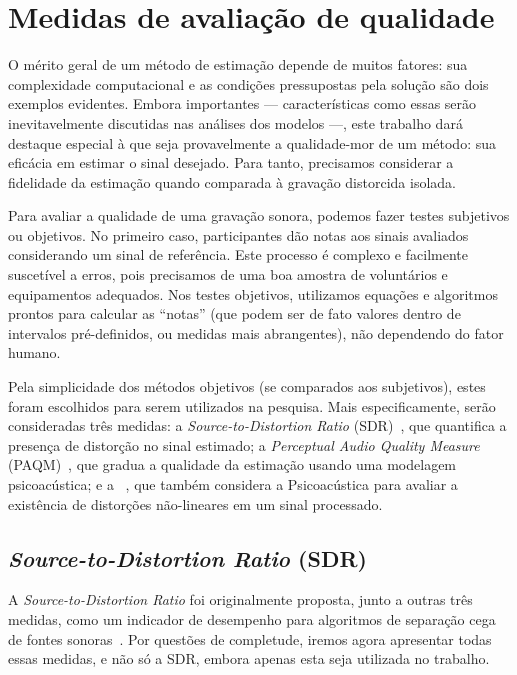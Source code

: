\chapter{Medidas de avaliação de qualidade}
\label{chapter:metrics}

O mérito geral de um método de estimação depende de muitos fatores: sua complexidade computacional e as condições pressupostas pela solução são dois exemplos evidentes. Embora importantes --- características como essas serão inevitavelmente discutidas nas análises dos modelos ---, este trabalho dará destaque especial à que seja provavelmente a qualidade-mor de um método: sua eficácia em estimar o sinal desejado. Para tanto, precisamos considerar a fidelidade da estimação quando comparada à gravação distorcida isolada.

Para avaliar a qualidade de uma gravação sonora, podemos fazer testes subjetivos ou objetivos. No primeiro caso, participantes dão notas aos sinais avaliados considerando um sinal de referência. Este processo é complexo e facilmente suscetível a erros, pois precisamos de uma boa amostra de voluntários e equipamentos adequados. Nos testes objetivos, utilizamos equações e algoritmos prontos para calcular as ``notas'' (que podem ser de fato valores dentro de intervalos pré-definidos, ou medidas mais abrangentes), não dependendo do fator humano.

Pela simplicidade dos métodos objetivos (se comparados aos subjetivos), estes foram escolhidos para serem utilizados na pesquisa. Mais especificamente, serão consideradas três medidas: a \textit{Source-to-Distortion Ratio} (SDR)~\cite{vincent-2006}, que quantifica a presença de distorção no sinal estimado; a \textit{Perceptual Audio Quality Measure} (PAQM)~\cite{beerends-1992}, que gradua a qualidade da estimação usando uma modelagem psicoacústica; e a \rnonlin{}~\cite{tan-2004}, que também considera a Psicoacústica para avaliar a existência de distorções não-lineares em um sinal processado.

\section{\textit{Source-to-Distortion Ratio} (SDR)}
\label{section:metrics:sdr}

A \textit{Source-to-Distortion Ratio} foi originalmente proposta, junto a outras três medidas, como um indicador de desempenho para algoritmos de separação cega de fontes sonoras~\cite{vincent-2006}. Por questões de completude, iremos agora apresentar todas essas medidas, e não só a SDR, embora apenas esta seja utilizada no trabalho.

